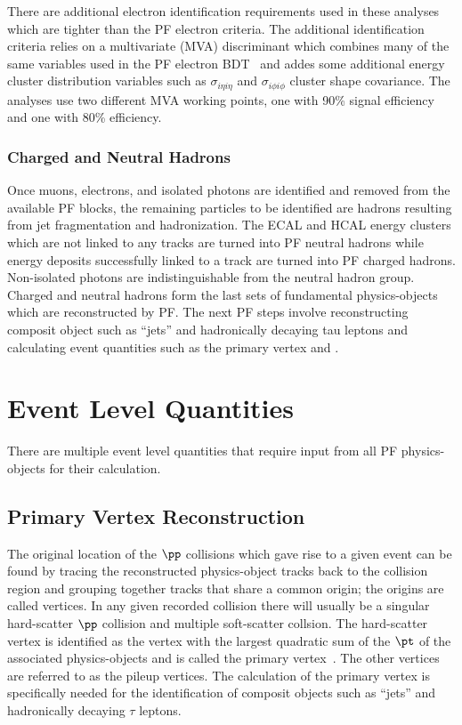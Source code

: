 There are additional electron identification requirements used in these analyses which are tighter
than the PF electron criteria. The additional identification criteria relies on a multivariate (MVA) discriminant
which combines many of the same variables used in the PF electron BDT~\cite{Khachatryan:2015hwa} 
and addes some additional energy cluster distribution variables such as $\sigma_{i\eta i\eta}$ and
$\sigma_{i\phi i\phi}$ cluster shape covariance. The analyses use
two different MVA working points, one with 90\% signal efficiency and one with 80\% efficiency.


\subsubsection{Charged and Neutral Hadrons}
Once muons, electrons, and isolated photons are identified and removed from the available PF blocks, 
the remaining particles to be identified are hadrons resulting from jet fragmentation and 
hadronization. The ECAL and HCAL energy clusters which are not linked to any tracks are turned into
PF neutral hadrons while energy deposits successfully linked to a track are turned into PF charged
hadrons. Non-isolated photons are indistinguishable from the neutral hadron group.
Charged and neutral hadrons form the last sets of fundamental physics-objects
which are reconstructed by PF. The next PF steps involve reconstructing composit object such as ``jets''
and hadronically decaying tau leptons and calculating event quantities such as the primary vertex and
\etvecmiss.


\section{Event Level Quantities}
There are multiple event level quantities that require input from all PF physics-objects for their
calculation.


\subsection{Primary Vertex Reconstruction}
The original location of the $\pp$ collisions which gave rise to a given event can be found by tracing
the reconstructed physics-object tracks back to the collision region and grouping together tracks that share a common
origin; the origins are called vertices. In any given recorded collision there will usually be a 
singular hard-scatter $\pp$ collision and multiple soft-scatter collsion. The hard-scatter vertex is 
identified as the vertex with the largest quadratic sum of the $\pt$ of the associated physics-objects 
and is called the primary vertex~\cite{Sirunyan:2017ulk}. The other vertices are referred to as the
pileup vertices. The calculation of the primary vertex is specifically needed for the identification of
composit objects such as ``jets'' and hadronically decaying $\tau$ leptons.


